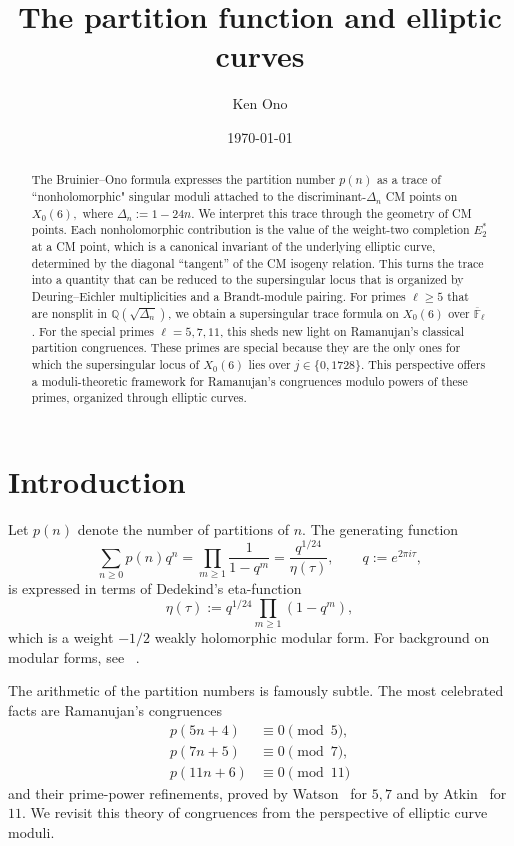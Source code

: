 \documentclass[12pt]{amsart}
\title[The partition function and elliptic curves]{The partition function and elliptic curves}
\author{Ken Ono}
\date{\today}
\theoremstyle{definition}
\theoremstyle{remark}
\newcommand{\F}{\mathbb{F}}
\begin{document}
\begin{abstract}
The Bruinier--Ono formula expresses the partition number $p(n)$ as a trace of  ``nonholomorphic" singular moduli attached to the discriminant-$\Delta_n$ CM points on $X_0(6),$ where $\Delta_n:=1-24n.$ We interpret this trace through the geometry of CM points. Each nonholomorphic contribution is the value of the weight-two completion $E_2^*$ at a CM point, which is a canonical invariant of the underlying elliptic curve, determined by the diagonal ``tangent'' of the CM isogeny relation. This turns the trace into a quantity that can be reduced to the supersingular locus that is organized by Deuring--Eichler multiplicities and a Brandt-module pairing. For primes $
\ell\geq 5$ that are nonsplit in $\mathbb{Q}(\sqrt{\Delta_n})$, we obtain a supersingular trace formula on $X_0(6)$ over $\overline{\F}_{\ell}$. For the special primes $\ell=5,7,11$, this sheds new light on Ramanujan's classical partition congruences. These primes are special because they are the only ones for which the supersingular locus of $X_0(6)$ lies over $j\in \{0, 1728\}.$ This perspective offers a moduli-theoretic framework for Ramanujan's congruences modulo powers of these primes, organized through elliptic curves.
\end{abstract}

\maketitle

\section{Introduction}\label{sec:intro}

Let $p(n)$ denote the number of partitions of $n$. The generating function
\[
\sum_{n\ge0}p(n)q^n=\prod_{m\ge1}\frac{1}{1-q^m}=\frac{q^{1/24}}{\eta(\tau)},
\qquad q:=e^{2\pi i\tau},
\]
is expressed in terms of Dedekind's eta-function
\[
\eta(\tau):=q^{1/24}\prod_{m\ge1}(1-q^m),
\]
which is a weight $-1/2$ weakly holomorphic modular form. For background on modular forms, see ~\cite{OnoWeb}. 

The arithmetic of the partition numbers is famously subtle. The most celebrated facts are
Ramanujan's congruences
\begin{equation}\label{eq:ram-base}
\begin{aligned}
p(5n+4)  &\equiv 0 \pmod{5},\\
p(7n+5)  &\equiv 0 \pmod{7},\\
p(11n+6) &\equiv 0 \pmod{11}
\end{aligned}
\end{equation}
and their prime-power refinements, proved by Watson~\cite{Watson1938} for $5,7$ and by
Atkin~\cite{Atkin} for $11$.
We revisit this theory of congruences from the perspective of elliptic curve moduli.
\end{document}
